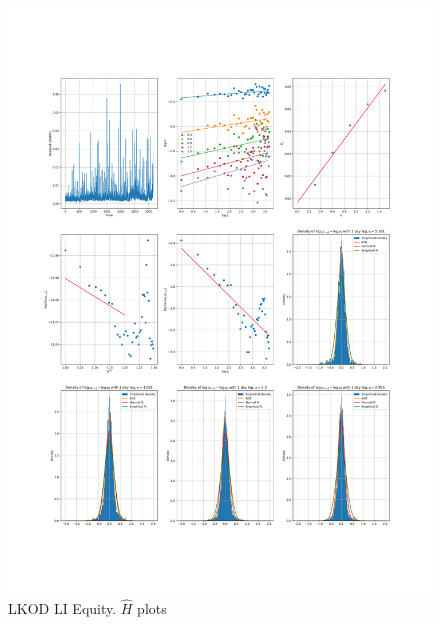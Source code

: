     \begin{figure}[h]
        \centering
        \includegraphics[width=\textwidth]{fig/LKOD LI Equity.pdf}
        \caption{LKOD LI Equity. $\hat{H}$ plots}
    \end{figure} 


